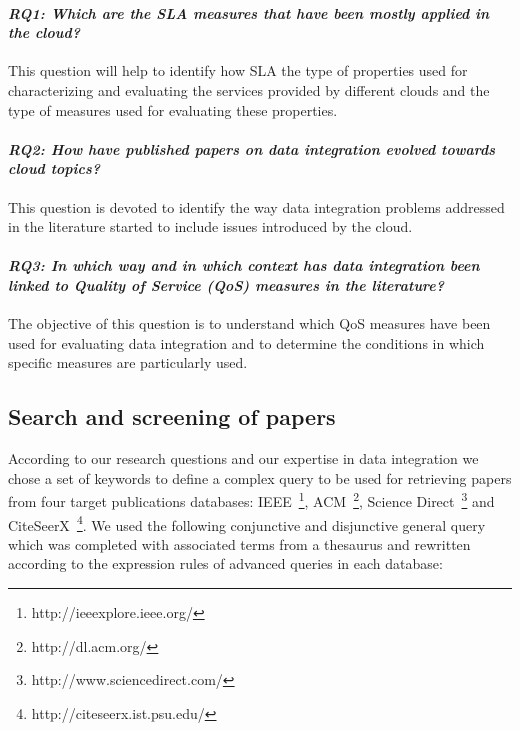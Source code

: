 \paragraph{\textit{\textbf{RQ1:} Which are the SLA measures that have been mostly
applied  in the cloud?}} This question will help  to identify how SLA the type of properties used for characterizing and evaluating the services provided  by different clouds and the type of measures used for evaluating these properties.


\paragraph{ \textit{\textbf{RQ2:}  How have published papers on data
 integration evolved towards cloud topics?}} This question is devoted to identify the way  data integration problems addressed in the literature started  to include issues introduced by the cloud.

\paragraph{\textit{\textbf{RQ3:} In which way and in which context has data integration been linked to Quality of Service (QoS) measures in the literature?}} The objective of this question is to understand which QoS measures have been used for evaluating data integration and to determine the conditions in which  specific measures are particularly used.

\subsection{Search and screening of papers} \label{subsec:search}

According to our research questions and our expertise in data integration we chose a set of keywords to define a complex query to be used for retrieving papers from four target publications databases: IEEE~\footnote{http://ieeexplore.ieee.org/},
ACM~\footnote{http://dl.acm.org/}, Science Direct~\footnote{http://www.sciencedirect.com/} and
CiteSeerX~\footnote{http://citeseerx.ist.psu.edu/}. We used the following conjunctive and disjunctive general query which was completed with associated terms from a thesaurus and rewritten according to the expression rules of advanced queries in each database: 


